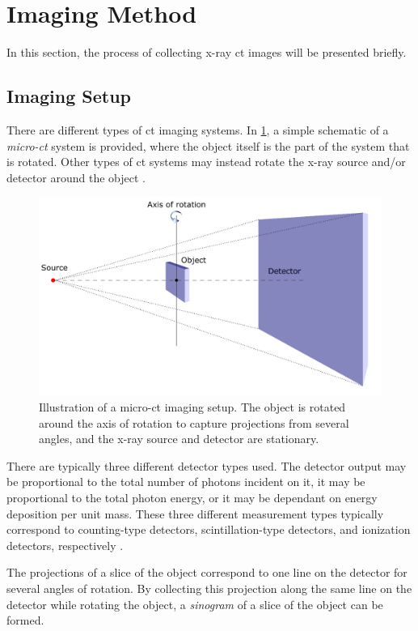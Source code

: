 \section{Imaging Method}
\label{sec:ct:imagingmethod}
In this section, the process of collecting x-ray \gls{ct} images will be presented briefly.

\subsection{Imaging Setup}
\label{sec:ct:imagingmethod:setup}
There are different types of \gls{ct} imaging systems. In \cref{fig:ctsetup}, a simple schematic of a \textit{micro-\gls{ct}} system is provided, where the object itself is the part of the system that is rotated. Other types of \gls{ct} systems may instead rotate the x-ray source and/or detector around the object \cite[126-129]{KakSlaney98}. 
\begin{figure}[htbp]  
    \centering
    \includegraphics[width=.9\textwidth]{figures/ctsetup.pdf}
    \caption[Illustration of a CT imaging setup]{Illustration of a micro-\gls{ct} imaging setup. The object is rotated around the axis of rotation to capture projections from several angles, and the x-ray source and detector are stationary. }
    \label{fig:ctsetup}
\end{figure}

There are typically three different detector types used. The detector output may be proportional to the total number of photons incident on it, it may be proportional to the total photon energy, or it may be dependant on energy deposition per unit mass. These three different measurement types typically correspond to counting-type detectors, scintillation-type detectors, and ionization detectors, respectively \cite[118]{KakSlaney98}. 

The projections of a slice of the object correspond to one line on the detector for several angles of rotation. By collecting this projection along the same line on the detector while rotating the object, a \textit{sinogram} of a slice of the object can be formed. 

